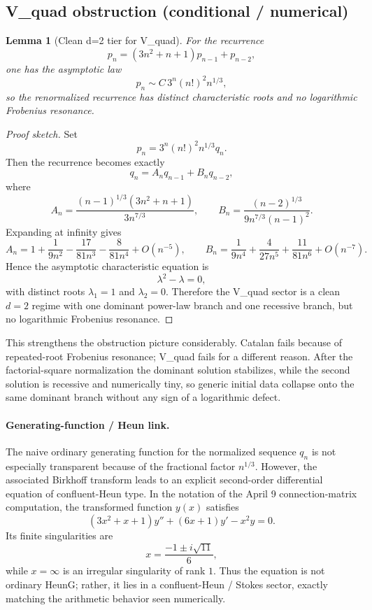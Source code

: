 \documentclass[11pt]{article}
\newtheorem{lemma}[theorem]{Lemma}
\begin{document}
\subsection{V\_quad obstruction (conditional / numerical)}
\begin{lemma}[Clean d=2 tier for V\_quad]\label{lem:vquad-outline}
For the recurrence
\[
p_n = (3n^2+n+1)p_{n-1} + p_{n-2},
\]
one has the asymptotic law
\[
p_n \sim C\,3^n (n!)^2 n^{1/3},
\]
so the renormalized recurrence has distinct characteristic roots and no logarithmic Frobenius resonance.
\end{lemma}

\begin{proof}[Proof sketch]
Set
\[
  p_n = 3^n (n!)^2 n^{1/3} q_n.
\]
Then the recurrence becomes exactly
\[
  q_n = A_n q_{n-1} + B_n q_{n-2},
\]
where
\[
  A_n = \frac{(n-1)^{1/3}(3n^2+n+1)}{3n^{7/3}},
  \qquad
  B_n = \frac{(n-2)^{1/3}}{9n^{7/3}(n-1)^2}.
\]
Expanding at infinity gives
\[
  A_n = 1 + \frac{1}{9n^2} - \frac{17}{81n^3} - \frac{8}{81n^4} + O(n^{-5}),
  \qquad
  B_n = \frac{1}{9n^4} + \frac{4}{27n^5} + \frac{11}{81n^6} + O(n^{-7}).
\]
Hence the asymptotic characteristic equation is
\[
  \lambda^2 - \lambda = 0,
\]
with distinct roots $\lambda_1=1$ and $\lambda_2=0$. Therefore the V\_quad sector is a clean $d=2$ regime with one dominant power-law branch and one recessive branch, but no logarithmic Frobenius resonance.
\end{proof}

This strengthens the obstruction picture considerably. Catalan fails because of repeated-root Frobenius resonance; V\_quad fails for a different reason. After the factorial-square normalization the dominant solution stabilizes, while the second solution is recessive and numerically tiny, so generic initial data collapse onto the same dominant branch without any sign of a logarithmic defect.

\paragraph{Generating-function / Heun link.}
The naive ordinary generating function for the normalized sequence $q_n$ is not especially transparent because of the fractional factor $n^{1/3}$. However, the associated Birkhoff transform leads to an explicit second-order differential equation of confluent-Heun type. In the notation of the April 9 connection-matrix computation, the transformed function $y(x)$ satisfies
\[
  (3x^2+x+1)y'' + (6x+1)y' - x^2 y = 0.
\]
Its finite singularities are
\[
  x = \frac{-1 \pm i\sqrt{11}}{6},
\]
while $x=\infty$ is an irregular singularity of rank $1$. Thus the equation is not ordinary HeunG; rather, it lies in a confluent-Heun / Stokes sector, exactly matching the arithmetic behavior seen numerically.
\end{document}
